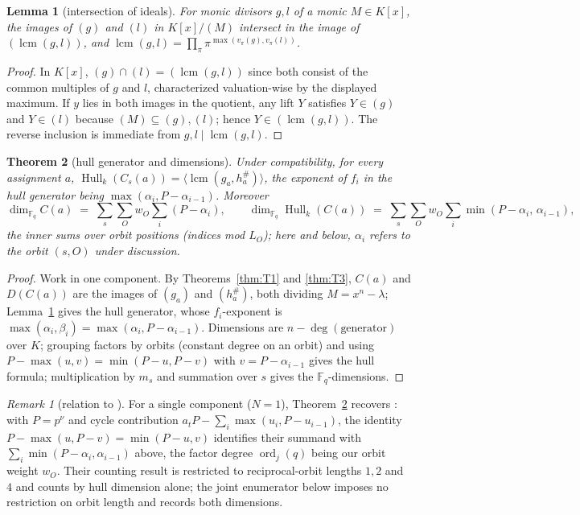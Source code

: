 \documentclass[10pt,journal,draftclsnofoot,onecolumn]{IEEEtran}
\newtheorem{theorem}{Theorem}[section]
\newtheorem{lemma}[theorem]{Lemma}
\theoremstyle{definition}
\theoremstyle{remark}
\newtheorem*{remark}{Remark}
\newcommand{\Fq}{\mathbb{F}_q}
\newcommand{\Hull}{\operatorname{Hull}}
\newcommand{\lcm}{\operatorname{lcm}}
\begin{document}
\begin{lemma}[intersection of ideals]\label{lem:lcm}
For monic divisors \(g, l\) of a monic \(M \in K[x]\), the images of
\((g)\) and \((l)\) in \(K[x]/(M)\) intersect in the image of
\((\lcm(g,l))\), and
\(\lcm(g,l) = \prod_{\pi} \pi^{\max(v_\pi(g), v_\pi(l))}\).
\end{lemma}

\begin{proof}
In \(K[x]\), \((g) \cap (l) = (\lcm(g,l))\) since both consist of the
common multiples of \(g\) and \(l\), characterized valuation-wise by the
displayed maximum. If \(y\) lies in both images in the quotient, any
lift \(Y\) satisfies \(Y \in (g)\) and \(Y \in (l)\) because
\((M) \subseteq (g), (l)\); hence \(Y \in (\lcm(g,l))\). The reverse
inclusion is immediate from \(g, l \mid \lcm(g,l)\).
\end{proof}

\begin{theorem}[hull generator and dimensions]\label{thm:T4}
Under compatibility, for every assignment \(a\),
\(\Hull_k(C_s(a)) = \langle \lcm(g_a, h_a^{\#}) \rangle\), the exponent
of \(f_i\) in the hull generator being \(\max(\alpha_i, P-\alpha_{i-1})\).
Moreover
\[
\dim_{\Fq} C(a) \;=\; \sum_{s} \sum_{O} w_O \sum_{i} (P - \alpha_i),
\qquad
\dim_{\Fq} \Hull_k(C(a)) \;=\; \sum_{s} \sum_{O} w_O \sum_i
\min(P-\alpha_i,\, \alpha_{i-1}),
\]
the inner sums over orbit positions (indices mod \(L_O\)); here and
below, \(\alpha_i\) refers to the orbit \((s,O)\) under discussion.
\end{theorem}

\begin{proof}
Work in one component. By Theorems~\ref{thm:T1} and \ref{thm:T3},
\(C(a)\) and \(D(C(a))\) are the images of \((g_a)\) and
\((h_a^{\#})\), both dividing \(M = x^n-\lambda\); Lemma~\ref{lem:lcm}
gives the hull generator, whose \(f_i\)-exponent is
\(\max(\alpha_i, \beta_i) = \max(\alpha_i, P-\alpha_{i-1})\). Dimensions
are \(n - \deg(\text{generator})\) over \(K\); grouping factors by
orbits (constant degree on an orbit) and using
\(P - \max(u,v) = \min(P-u, P-v)\) with \(v = P-\alpha_{i-1}\) gives the
hull formula; multiplication by \(m_s\) and summation over \(s\) gives
the \(\Fq\)-dimensions.
\end{proof}

\begin{remark}[relation to \cite{DPI2023}]
For a single component (\(N = 1\)), Theorem~\ref{thm:T4} recovers
\cite[Theorem~3]{DPI2023}: with \(P = p^{\nu}\) and cycle contribution
\(a_t P - \sum_i \max(u_i, P - u_{i-1})\), the identity
\(P - \max(u, P - v) = \min(P - u, v)\) identifies their summand with
\(\sum_i \min(P - \alpha_i, \alpha_{i-1})\) above, the factor degree
\(\operatorname{ord}_j(q)\) being our orbit weight \(w_O\). Their
counting result \cite[Theorem~4]{DPI2023} is restricted to
reciprocal-orbit lengths \(1, 2\) and \(4\) and counts by hull
dimension alone; the joint enumerator below imposes no restriction on
orbit length and records both dimensions.
\end{remark}
\end{document}
